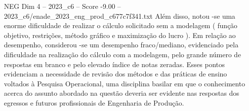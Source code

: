 \begin{textsample}{NEG Dim 4 – 2023\_c6 – Score -9.00 – 2023\_c6/enade\_2023\_eng\_prod\_c677c7f341.txt}
Além disso, notou -se uma enorme dificuldade de realizar o cálculo solicitado sem a modelagem ( função objetivo, restrições, método gráfico e maximização do lucro ).
Em relação ao desempenho, considerou -se um desempenho fraco/mediano, evidenciado pela dificuldade na realização do cálculo com a modelagem, pelo grande número de respostas em branco e pelo elevado índice de notas zeradas.
Esses pontos evidenciam a necessidade de revisão dos métodos e das práticas de ensino voltados à Pesquisa Operacional, uma disciplina basilar em que o conhecimento acerca do assunto abordado na questão deveria ser evidente nas respostas dos egressos e futuros profissionais de Engenharia de Produção.

\end{textsample}
